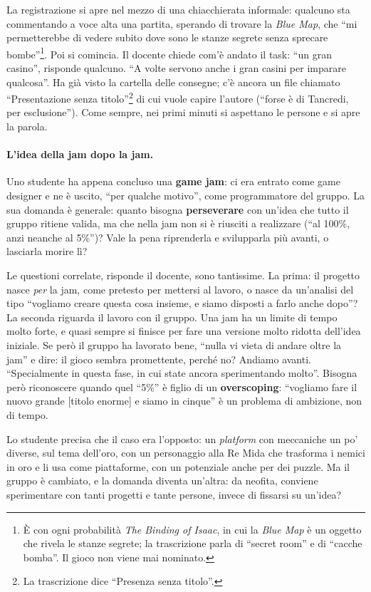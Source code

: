 La registrazione si apre nel mezzo di una chiacchierata informale: qualcuno sta
commentando a voce alta una partita, sperando di trovare la \emph{Blue Map}, che
``mi permetterebbe di vedere subito dove sono le stanze segrete senza sprecare
bombe''\footnote{È con ogni probabilità \emph{The Binding of Isaac}, in cui la
\emph{Blue Map} è un oggetto che rivela le stanze segrete; la trascrizione parla
di ``secret room'' e di ``cacche bomba''. Il gioco non viene mai nominato.}. Poi
si comincia. Il docente chiede com'è andato il task: ``un gran casino'', risponde
qualcuno. ``A volte servono anche i gran casini per imparare qualcosa''. Ha già
visto la cartella delle consegne; c'è ancora un file chiamato ``Presentazione
senza titolo''\footnote{La trascrizione dice ``Presenza senza titolo''.} di cui
vuole capire l'autore (``forse è di Tancredi, per esclusione''). Come sempre, nei
primi minuti si aspettano le persone e si apre la parola.

\paragraph{L'idea della jam dopo la jam.} Uno studente ha appena concluso una
\textbf{game jam}: ci era entrato come game designer e ne è uscito, ``per qualche
motivo'', come programmatore del gruppo. La sua domanda è generale: quanto bisogna
\textbf{perseverare} con un'idea che tutto il gruppo ritiene valida, ma che nella
jam non si è riusciti a realizzare (``al 100\%, anzi neanche al 5\%'')? Vale la
pena riprenderla e svilupparla più avanti, o lasciarla morire lì?

Le questioni correlate, risponde il docente, sono tantissime. La prima: il
progetto nasce \emph{per} la jam, come pretesto per mettersi al lavoro, o nasce da
un'analisi del tipo ``vogliamo creare questa cosa insieme, e siamo disposti a
farlo anche dopo''? La seconda riguarda il lavoro con il gruppo. Una jam ha un
limite di tempo molto forte, e quasi sempre si finisce per fare una versione molto
ridotta dell'idea iniziale. Se però il gruppo ha lavorato bene, ``nulla vi vieta
di andare oltre la jam'' e dire: il gioco sembra promettente, perché no? Andiamo
avanti. ``Specialmente in questa fase, in cui state ancora sperimentando
molto''. Bisogna però riconoscere quando quel ``5\%'' è figlio di un
\textbf{overscoping}: ``vogliamo fare il nuovo grande [titolo enorme] e siamo in
cinque'' è un problema di ambizione, non di tempo.

Lo studente precisa che il caso era l'opposto: un \emph{platform} con meccaniche un
po' diverse, sul tema dell'oro, con un personaggio alla Re Mida che trasforma i
nemici in oro e li usa come piattaforme, con un potenziale anche per dei puzzle.
Ma il gruppo è cambiato, e la domanda diventa un'altra: da neofita, conviene
sperimentare con tanti progetti e tante persone, invece di fissarsi su un'idea?

